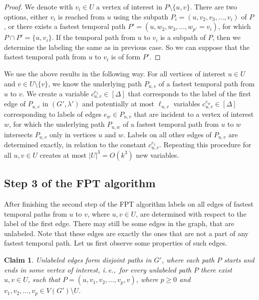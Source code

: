 \documentclass[11pt,a4paper]{article}
\newtheorem{claim}[theorem]{Claim}
\theoremstyle{remark}
\theoremstyle{definition}
\newcommand{\ie}{i.\,e.,\ }
\begin{document}
\begin{proof}
We denote with $v_i \in U$ a vertex of interest in $P \setminus \{u,v\}$.
There are two options, either $v_i$ is reached from $u$ using the subpath $P_i = (u, v_2, v_3, \dots, v_i)$ of $P$,
or there exists a fastest temporal path $P' = (u, w_2, w_3, \dots, w_{p'} = v_i)$, for which $P \cap P' = \{u, v_i\}$.
If the temporal path from $u$ to $v_i$ is a subpath of $P$, then we determine the labeling the same as in previous case.
So we can suppose that the fastest temporal path from $u$ to $v_i$ is of form $P'$.
\end{proof}
 
We use the above results in the following way.
For all vertices of interest $u \in U$ and $v \in U \setminus \{v\}$, we know the underlying path $P_{u,v}$ of a fastest temporal path from $u$ to $v$. 
We create a variable $c_{u,v}^{e_1} \in [\Delta]$ that corresponds to the label of the first edge of $P_{u,v}$ in $(G', \lambda')$ and potentially at most $\ell_{u,v}$ variables $c_{u,v}^{e_w} \in [\Delta]$ corresponding to 
labels of edges $e_w \in P_{u,v}$ that are incident to a vertex of interest $w$, for which the underlying path $P_{u,w}$ of a fastest temporal path from $u$ to $w$ intersects $P_{u,v}$ only in vertices $u$ and $w$.
Labels on all other edges of $P_{u,v}$ are determined exactly, in relation to the constant $c_{u,v}^{e_1}$.
Repeating this procedure for all $u,v \in U$ creates at most $|U|^3 = O(k^3)$ new variables.


\subsection{Step 3 of the FPT algorithm}

After finishing the second step of the FPT algorithm labels on all edges of fastest temporal paths from $u$ to $v$, where $u,v \in U$, are determined with respect to the label of the first edge.
There may still be some edges in the graph, that are unlabeled. Note that these edges are exactly the ones that are not a part of any fastest temporal path.
Let us first observe some properties of such edges.

\begin{claim}
    Unlabeled edges form disjoint paths in $G'$, where each path $P$ starts and ends in some vertex of interest, 
    \ie for every unlabeled path $P$ there exist $u,v \in U$, such that $P = (u, v_1, v_2, \dots, v_p, v)$, where $p \geq 0$ and $v_1,v_2,\dots,v_p \in V(G') \setminus U$.
\end{claim}
\end{document}
